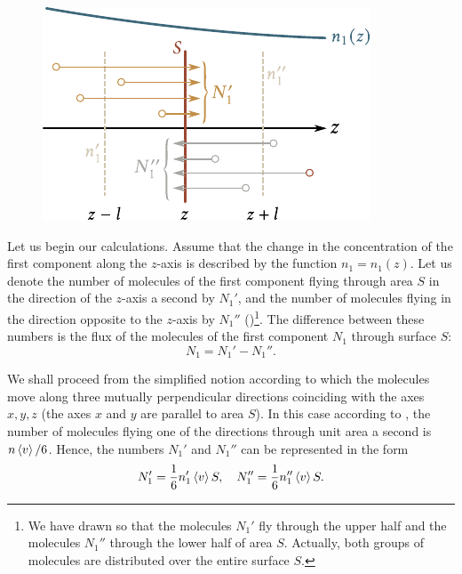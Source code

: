 \begin{figure}[t]
	\begin{center}
		\includegraphics[scale=1]{figures/ch_16/fig_16_6.pdf}
		\caption[]{}
		\label{fig:16_6}
	\end{center}
	\vspace{-0.8cm}
\end{figure}

Let us begin our calculations. Assume that the change in the concentration of the first component along the $z$-axis is described by the function $n_1=n_1(z)$. Let us denote the number of molecules of the first component flying through area $S$ in the direction of the $z$-axis a second by $N_1'$, and the number of molecules flying in the direction opposite to the $z$-axis by $N_1''$ ()\footnote{We have drawn  so that the molecules $N_1'$ fly through the upper half and the molecules $N_1''$ through the lower half of area $S$. Actually, both groups of molecules are distributed over the entire surface $S$.}. The difference between these numbers is the flux of the molecules of the first component $N_1$ through surface $S$:
\begin{equation}\label{eq:16_13}
    N_1 = N_1' - N_1''.
\end{equation}

We shall proceed from the simplified notion according to which the molecules move along three mutually perpendicular directions coinciding with the axes $x, y, z$ (the axes $x$ and $y$ are parallel to area $S$). In this case according to , the number of molecules flying one of the directions through unit area a second is $n\left\langle v \right\rangle/6$. Hence, the numbers $N_1'$ and $N_1''$ can be represented in the form
\begin{equation}\label{eq:16_14}
    N_1' = \frac{1}{6}n_1'\left\langle v \right\rangle S,\quad N_1'' = \frac{1}{6}n_1''\left\langle v \right\rangle S.
\end{equation}

